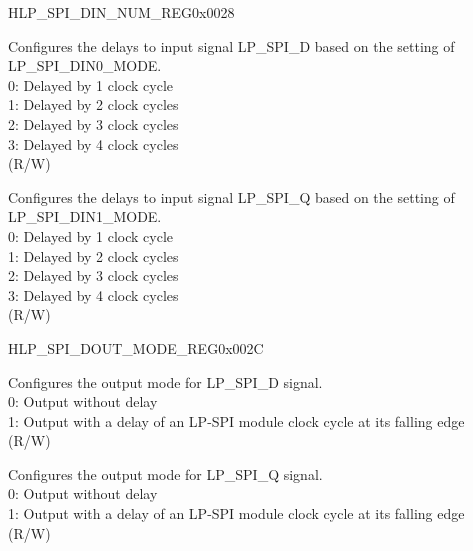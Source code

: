 \begin{register}{H}{LP\_SPI\_DIN\_NUM\_REG}{0x0028}\label{regdesc:LPSPIDINNUMREG}
%
%
%
%
%
\regnewline%
\begin{regdesc}\begin{reglist}
\label{fielddesc:LPSPIDIN0NUM}\item [LP\_SPI\_DIN0\_NUM] Configures the delays to input signal LP\_SPI\_D based on the setting of LP\_SPI\_DIN0\_MODE.\\
0: Delayed by 1 clock cycle\\
1: Delayed by 2 clock cycles\\
2: Delayed by 3 clock cycles\\
3: Delayed by 4 clock cycles\\
 (R/W)
\label{fielddesc:LPSPIDIN1NUM}\item [LP\_SPI\_DIN1\_NUM] Configures the delays to input signal LP\_SPI\_Q based on the setting of LP\_SPI\_DIN1\_MODE.\\
0: Delayed by 1 clock cycle\\
1: Delayed by 2 clock cycles\\
2: Delayed by 3 clock cycles\\
3: Delayed by 4 clock cycles\\
 (R/W)
\end{reglist}\end{regdesc}
\end{register}


\begin{register}{H}{LP\_SPI\_DOUT\_MODE\_REG}{0x002C}\label{regdesc:LPSPIDOUTMODEREG}
%
%
%
%
%
\regnewline%
\begin{regdesc}\begin{reglist}
\label{fielddesc:LPSPIDOUT0MODE}\item [LP\_SPI\_DOUT0\_MODE] Configures the output mode for LP\_SPI\_D signal.\\
0: Output without delay\\
1: Output with a delay of an LP-SPI module clock cycle at its falling edge\\
 (R/W)
\label{fielddesc:LPSPIDOUT1MODE}\item [LP\_SPI\_DOUT1\_MODE] Configures the output mode for LP\_SPI\_Q signal.\\
0: Output without delay\\
1: Output with a delay of an LP-SPI module clock cycle at its falling edge\\
 (R/W)
\end{reglist}\end{regdesc}
\end{register}


